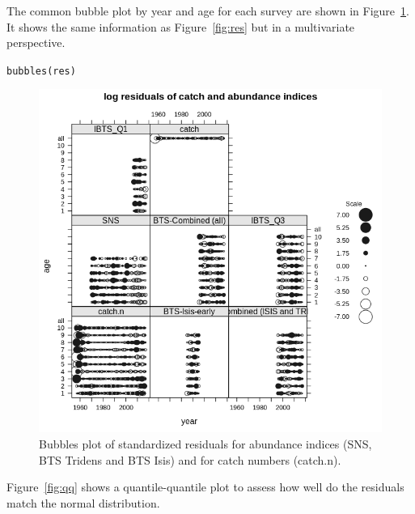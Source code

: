 \documentclass[a4paper,english,10pt]{article}\usepackage[]{graphicx}\usepackage[]{color}
\makeatletter
\newcommand{\hlstd}[1]{\textcolor[rgb]{0.196,0.196,0.196}{#1}}%
\newcommand{\hlkwd}[1]{\textcolor[rgb]{0.78,0.227,0.412}{#1}}%
\newenvironment{kframe}{%
 \def\at@end@of@kframe{}%
 \ifinner\ifhmode%
  \def\at@end@of@kframe{\end{minipage}}%
  \begin{minipage}{\columnwidth}%
 \fi\fi%
 \def\FrameCommand##1{\hskip\@totalleftmargin \hskip-\fboxsep
 \colorbox{shadecolor}{##1}\hskip-\fboxsep
     \hskip-\linewidth \hskip-\@totalleftmargin \hskip\columnwidth}%
 \MakeFramed {\advance\hsize-\width
   \@totalleftmargin\z@ \linewidth\hsize
   \@setminipage}}%
 {\par\unskip\endMakeFramed%
 \at@end@of@kframe}
\newenvironment{knitrout}{}{} %
\makeatother
\begin{document}
The common bubble plot by year and age for each survey are shown in Figure~\ref{fig:bub}. It shows the same information as Figure~\ref{fig:res} but in a multivariate perspective.

\begin{knitrout}
\color{fgcolor}\begin{kframe}
\begin{alltt}
\hlkwd{bubbles}\hlstd{(res)}
\end{alltt}
\end{kframe}\begin{figure}[H]

{\centering \includegraphics[width=.9\linewidth]{figure/bub-1} 

}

\caption[Bubbles plot of standardized residuals for abundance indices (SNS, BTS Tridens and BTS Isis) and for catch numbers (catch.n)]{Bubbles plot of standardized residuals for abundance indices (SNS, BTS Tridens and BTS Isis) and for catch numbers (catch.n).}\label{fig:bub}
\end{figure}


\end{knitrout}

Figure~\ref{fig:qq} shows a quantile-quantile plot to assess how well do the residuals match the normal distribution.
\end{document}
